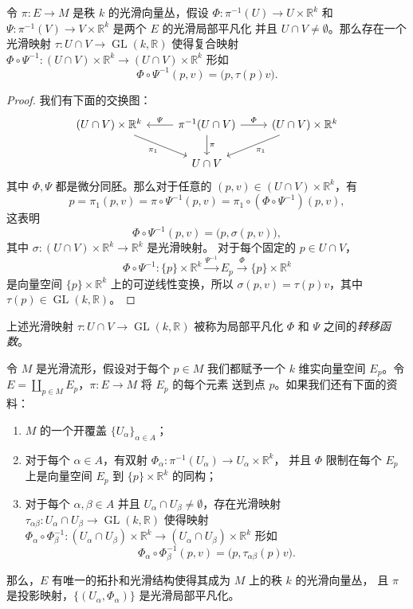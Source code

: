 \documentclass[fontset=none]{Notes}
\DeclareMathOperator\GL{GL}
\begin{document}
\begin{lemma}
  令 $\pi:E\to M$ 是秩 $k$ 的光滑向量丛，假设 $\varPhi:\pi^{-1}(U)\to U\times \mathbb{R}^k$
  和 $\varPsi:\pi^{-1}(V)\to V\times \mathbb{R}^k$ 是两个 $E$ 的光滑局部平凡化
  并且 $U\cap V\neq\emptyset$。那么存在一个光滑映射 $\tau:U\cap V\to \GL(k,\mathbb{R})$
  使得复合映射 $\varPhi\circ\varPsi^{-1}:(U\cap V)\times \mathbb{R}^k\to (U\cap V)\times \mathbb{R}^k$
  形如
  \[
    \varPhi\circ\varPsi^{-1}(p,v)=\bigl(p,\tau(p)v\bigr)  .
  \]
\end{lemma}
\begin{proof}
  我们有下面的交换图：
  \[
    \begin{tikzcd}[column sep=2.4em]
      (U\cap V)\times \mathbb{R}^k\arrow[dr,"\pi_1"']
      &
      \pi^{-1}(U\cap V)\arrow[l,"\varPsi"']\arrow[r,"\varPhi"]\arrow[d,"\pi"]
      &
      (U\cap V)\times \mathbb{R}^k\arrow[dl,"\pi_1"]\\
      & 
      U\cap V
      &
    \end{tikzcd}  
  \]
  其中 $\varPhi,\varPsi$ 都是微分同胚。那么对于任意的
  $(p,v)\in(U\cap V)\times \mathbb{R}^k$，有
  \[
    p=\pi_1(p,v)=\pi\circ\varPsi^{-1}(p,v)=\pi_1\circ(\varPhi\circ\varPsi^{-1})
    (p,v),  
  \]
  这表明
  \[
    \varPhi\circ\varPsi^{-1}(p,v)=\bigl(p,\sigma(p,v)\bigr),
  \]
  其中 $\sigma:(U\cap V)\times \mathbb{R}^k\to \mathbb{R}^k$ 是光滑映射。
  对于每个固定的 $p\in U\cap V$，
  \[ 
    \varPhi\circ\varPsi^{-1}:\{p\}\times \mathbb{R}^k\xrightarrow{\varPsi^{-1}}
    E_p\xrightarrow{\varPhi}\{p\}\times \mathbb{R}^k
  \]
  是向量空间 $\{p\}\times \mathbb{R}^k$ 上的可逆线性变换，所以
  $\sigma(p,v)=\tau(p)v$，其中 $\tau(p)\in\GL(k,\mathbb{R})$。
\end{proof}

上述光滑映射 $\tau:U\cap V\to\GL(k,\mathbb{R})$ 被称为局部平凡化
$\varPhi$ 和 $\varPsi$ 之间的\emph{转移函数}。

\begin{lemma}[向量丛坐标卡引理]
  令 $M$ 是光滑流形，假设对于每个 $p\in M$ 我们都赋予一个 $k$ 维实向量空间
  $E_p$。令 $E=\coprod_{p\in M}E_p$，$\pi:E\to M$ 将 $E_p$ 的每个元素
  送到点 $p$。如果我们还有下面的资料：
  \begin{enumerate}
    \item $M$ 的一个开覆盖 $\{U_\alpha\}_{\alpha\in A}$；
    \item 对于每个 $\alpha\in A$，有双射 $\varPhi_\alpha:\pi^{-1}(U_\alpha)\to U_\alpha\times \mathbb{R}^k$，
    并且 $\varPhi$ 限制在每个 $E_p$ 上是向量空间 $E_p$ 到 $\{p\}\times \mathbb{R}^k$ 的同构；
    \item 对于每个 $\alpha,\beta\in A$ 并且 $U_\alpha\cap U_\beta\neq\emptyset$，存在光滑映射
    $\tau_{\alpha\beta}:U_\alpha\cap U_\beta\to \GL(k,\mathbb{R})$ 使得映射
    $\varPhi_\alpha\circ\varPhi_\beta^{-1}:(U_\alpha\cap U_\beta)\times \mathbb{R}^k\to (U_\alpha\cap U_\beta)\times \mathbb{R}^k$
    形如
    \[
      \varPhi_\alpha\circ\varPhi_\beta^{-1}(p,v)=\bigl(p,\tau_{\alpha\beta}(p)v\bigr).  
    \]
  \end{enumerate}
  那么，$E$ 有唯一的拓扑和光滑结构使得其成为 $M$ 上的秩 $k$ 的光滑向量丛，
  且 $\pi$ 是投影映射，$\{(U_\alpha,\varPhi_\alpha)\}$ 是光滑局部平凡化。
\end{lemma}
\end{document}
